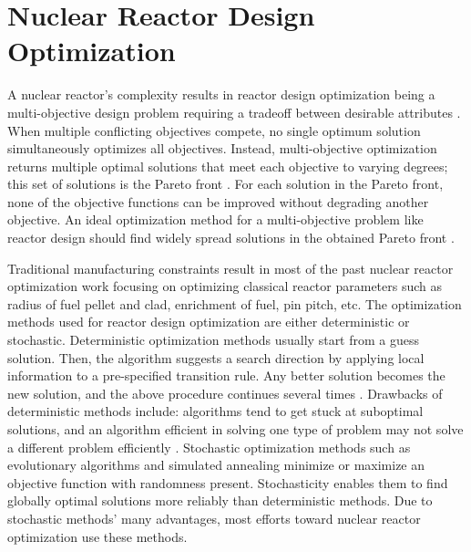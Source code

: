 
\section{Nuclear Reactor Design Optimization}
\label{sec:opt}
A nuclear reactor's complexity results in reactor design optimization being a 
multi-objective design problem requiring a tradeoff between desirable 
attributes \cite{byrne_evolving_2014,simon_sciences_2019}. 
When multiple conflicting objectives compete, no single optimum solution 
simultaneously optimizes all objectives. 
Instead, multi-objective optimization returns multiple optimal 
solutions that meet each objective to varying degrees; this set of solutions is 
the Pareto front \cite{deb_multi-objective_2001}. 
For each solution in the Pareto front, none of the objective functions can be 
improved without degrading another objective.
An ideal optimization method for a multi-objective problem like reactor design 
should find widely spread solutions in the obtained Pareto front 
\cite{deb_multi-objective_2001}. 

Traditional manufacturing constraints result in most of the past nuclear reactor 
optimization work focusing on optimizing classical reactor 
parameters such as radius of fuel pellet and clad, enrichment of fuel, 
pin pitch, etc. 
The optimization methods used for reactor design optimization are either 
deterministic or stochastic. 
Deterministic optimization methods usually start from a guess solution.
Then, the algorithm suggests a search direction by applying local 
information to a pre-specified transition rule. 
Any better solution becomes the new solution, and the above procedure continues 
several times \cite{deb_multi-objective_2001}. 
Drawbacks of deterministic methods include: algorithms tend to get stuck at
suboptimal solutions, and an algorithm efficient in solving one type of problem 
may not solve a different problem efficiently \cite{deb_multi-objective_2001}. 
Stochastic optimization methods such as evolutionary algorithms and simulated annealing
minimize or maximize an objective function with randomness present. 
Stochasticity enables them to find globally optimal solutions more reliably than 
deterministic methods. 
Due to stochastic methods' many advantages, most efforts toward nuclear 
reactor optimization use these methods. 

